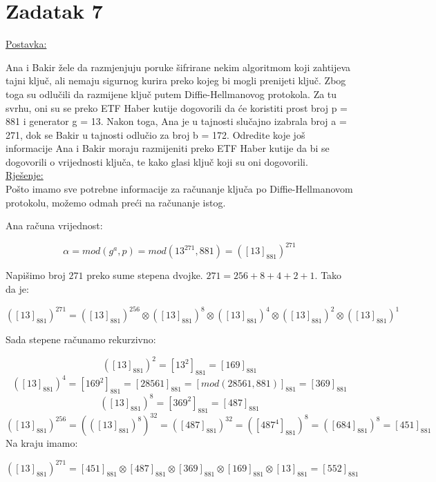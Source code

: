 \documentclass[12pt]{article}
\begin{document}
\newpage

\section*{Zadatak 7\label{Z7}}

\underline{Postavka:}

Ana i Bakir žele da razmjenjuju poruke šifrirane nekim algoritmom koji zahtijeva tajni ključ, ali nemaju sigurnog kurira preko kojeg bi mogli prenijeti ključ. Zbog toga su odlučili da razmijene ključ putem Diffie-Hellmanovog protokola. Za tu svrhu, oni su se preko ETF Haber kutije dogovorili da će koristiti prost broj p = 881 i generator g = 13. Nakon toga, Ana je u tajnosti slučajno izabrala broj a = 271, dok se Bakir u tajnosti odlučio za broj b = 172. Odredite koje još informacije Ana i Bakir moraju razmijeniti preko ETF Haber kutije da bi se dogovorili o vrijednosti ključa, te kako glasi ključ koji su oni dogovorili.\\

\underline{Rješenje:}\\


Pošto imamo sve potrebne informacije za računanje ključa po Diffie-Hellmanovom protokolu, možemo odmah preći na računanje istog.

Ana računa vrijednost:

$$\alpha = mod(g^a, p) = mod(13^{271}, 881) = ([13]_{881})^{271}$$\vspace{1mm}

Napišimo broj $271$ preko sume stepena dvojke. $271 = 256 + 8 + 4 + 2 + 1$. Tako da je:

$$([13]_{881})^{271} = ([13]_{881})^{256} \otimes ([13]_{881})^{8} \otimes ([13]_{881})^{4} \otimes ([13]_{881})^{2} \otimes ([13]_{881})^{1}$$\vspace{1mm}

Sada stepene računamo rekurzivno:

$$([13]_{881})^{2} = [13^{2}]_{881} = [169]_{881}$$
$$([13]_{881})^{4} = [169^{2}]_{881} = [28561]_{881} = [mod(28561, 881)]_{881} = [369]_{881}$$
$$([13]_{881})^{8} = [369^{2}]_{881} = [487]_{881}$$
$$([13]_{881})^{256} = (([13]_{881})^{8})^{32} = ([487]_{881})^{32} = ([487^{4}]_{881})^{8} = ([684]_{881})^{8} = [451]_{881}$$\vspace{1mm}
\newpage
Na kraju imamo:

$$([13]_{881})^{271} = [451]_{881} \otimes [487]_{881} \otimes [369]_{881} \otimes [169]_{881} \otimes [13]_{881} = [552]_{881}$$\vspace{1mm}
\end{document}
